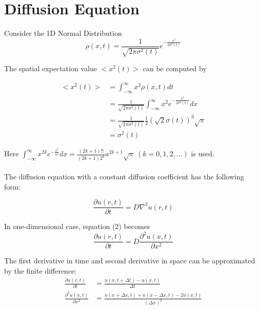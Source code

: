 \documentclass{article}
\begin{document}
\section{Diffusion Equation}
Consider the 1D Normal Distribution\\

\begin{equation}
\rho(x,t) = \frac{1}{\sqrt{2\pi \sigma^2 (t)}} e^{-\frac{x^2}{2\sigma^2(t)}}
\end{equation}

The spatial expectation value $<x^2(t)>$ can be computed by

\begin{align*}
<x^2(t)> & = \int_{-\infty}^{\infty} x^2 \rho(x,t) dt \\
& = \frac{1}{\sqrt{2\pi \sigma^2 (t)}} \int_{-\infty}^{\infty} x^2 e^{-\frac{x^2}{2\sigma^2(t)}} dx \\
& = \frac{1}{\sqrt{2\pi \sigma^2 (t)}} \frac{1}{2} (\sqrt{2} \sigma(t))^3 \sqrt{\pi} \\
& = \sigma^2 (t)
\end{align*}

Here $\int_{-\infty}^{\infty} x^{2k} e^{-\frac{x^2}{a^2}} dx = \frac{(2k+1)!!}{(2k+1)2^k} a^{2k+1} \sqrt{\pi}\ (k=0,1,2,...)$ is used.\\
\\
The diffusion equation with a constant diffusion coefficient has the following form:

\begin{equation}
\frac{\partial u (r,t)}{\partial t} = D \nabla^2 u(r,t)
\end{equation}

In one-dimensional case, equation (2) becomes\\

\begin{equation}
\frac{\partial u (r,t)}{\partial t} = D \frac{\partial^2 u(x,t)}{\partial x^2}
\end{equation}

The first derivative in time and second derivative in space can be approximated by the finite difference:\\

\begin{align*}
\frac{\partial u (r,t)}{\partial t} & = \frac{u(x,t+\Delta t) - u(x,t)}{\Delta t} \\
\frac{\partial^2 u(x,t)}{\partial x^2} & = \frac{u(x+\Delta x,t)+u(x-\Delta x,t)-2u(x,t)}{(\Delta x)^2}
\end{align*}
\end{document}

